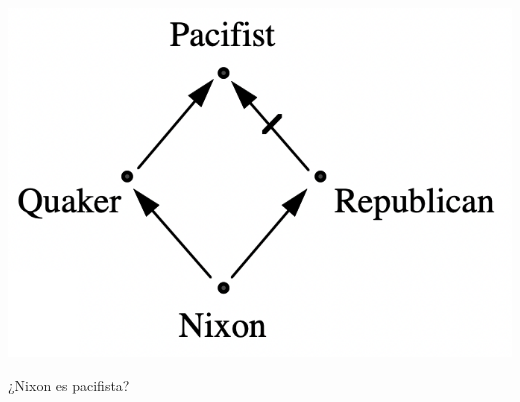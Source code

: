 \documentclass[
10pt, %
aspectratio=169, %
]{beamer}
\begin{document}
\begin{frame}
\begin{enumerate}
{\begin{minipage}{0.43\textwidth}
\begin{itemize}
					\end{itemize}
					
				\end{minipage}
				\hfill  %
				\begin{minipage}{0.43\textwidth} %
					
					\centering
					\includegraphics[scale=0.5]{herencia-cancelable.png}
					
					\vspace{2\baselineskip}
					¿Nixon es pacifista?
					
				\end{minipage}
		
			}
			
		\end{enumerate}
		
	\end{frame}
	
\end{document}
